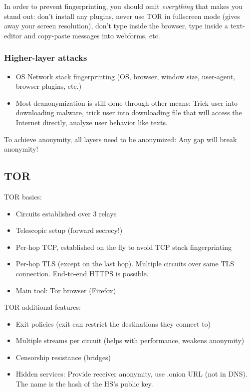 \documentclass[11pt,oneside,a4paper]{article}
\begin{document}
In order to prevent fingerprinting, you should omit \textit{everything} that makes you stand out: don't install any plugins, never use TOR in fullscreen mode (gives away your screen resolution), don't type inside the browser, type inside a text-editor and copy-paste messages into webforms, etc.

\subsubsection{Higher-layer attacks}

\vspace{-\topsep}
\begin{itemize}
	\setlength{\itemsep}{0pt}
	\setlength{\parskip}{0pt}
	\item OS Network stack fingerprinting (OS, browser, window size, user-agent, browser plugins, etc.)
	\item Most deanonymization is still done through other means: Trick user into downloading malware, trick user into downloading file that will access the Internet directly, analyze user behavior like texts.
\end{itemize}
\vspace{-\topsep}

To achieve anonymity, all layers need to be anonymized: Any gap will break anonymity!

\subsection{TOR}

TOR basics:

\vspace{-\topsep}
\begin{itemize}
	\setlength{\itemsep}{0pt}
	\setlength{\parskip}{0pt}
	\item Circuits established over 3 relays
	\item Telescopic setup (forward secrecy!)
	\item Per-hop TCP, established on the fly to avoid TCP stack fingerprinting
	\item Per-hop TLS (except on the last hop). Multiple circuits over same TLS connection. End-to-end HTTPS is possible.
	\item Main tool: Tor browser (Firefox)
\end{itemize}
\vspace{-\topsep}

TOR additional features:

\vspace{-\topsep}
\begin{itemize}
	\setlength{\itemsep}{0pt}
	\setlength{\parskip}{0pt}
	\item Exit policies (exit can restrict the destinations	they connect to)
	\item Multiple streams per circuit (helps with performance, weakens anonymity)
	\item Censorship resistance (bridges)
	\item Hidden services: Provide receiver anonymity, use .onion URL (not in DNS). The name is the hash of the HS’s public key.
\end{itemize}
\vspace{-\topsep}
\end{document}
